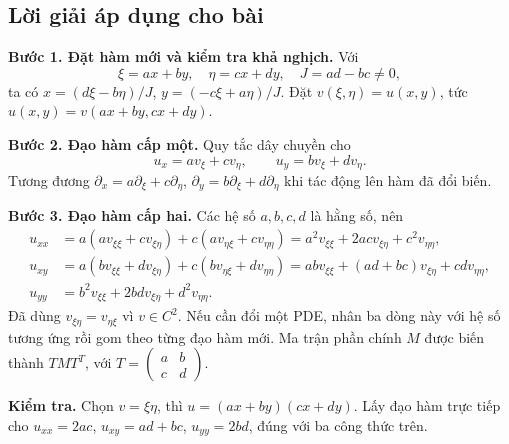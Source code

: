 \documentclass[10pt,a4paper]{article}
\begin{document}
\subsection*{Lời giải áp dụng cho bài}
\textbf{Bước 1. Đặt hàm mới và kiểm tra khả nghịch.} Với
\[\xi=ax+by,\quad\eta=cx+dy,\quad J=ad-bc\ne0,\]
ta có $x=(d\xi-b\eta)/J$, $y=(-c\xi+a\eta)/J$. Đặt $v(\xi,\eta)=u(x,y)$, tức $u(x,y)=v(ax+by,cx+dy)$.

\textbf{Bước 2. Đạo hàm cấp một.} Quy tắc dây chuyền cho
\[u_x=a v_\xi+c v_\eta,\qquad u_y=b v_\xi+d v_\eta.\]
Tương đương $\partial_x=a\partial_\xi+c\partial_\eta$, $\partial_y=b\partial_\xi+d\partial_\eta$ khi tác động lên hàm đã đổi biến.

\textbf{Bước 3. Đạo hàm cấp hai.} Các hệ số $a,b,c,d$ là hằng số, nên
\begin{align*}
u_{xx}&=a(av_{\xi\xi}+cv_{\xi\eta})+c(av_{\eta\xi}+cv_{\eta\eta})
=a^2v_{\xi\xi}+2acv_{\xi\eta}+c^2v_{\eta\eta},\\
u_{xy}&=a(bv_{\xi\xi}+dv_{\xi\eta})+c(bv_{\eta\xi}+dv_{\eta\eta})
=abv_{\xi\xi}+(ad+bc)v_{\xi\eta}+cdv_{\eta\eta},\\
u_{yy}&=b^2v_{\xi\xi}+2bdv_{\xi\eta}+d^2v_{\eta\eta}.
\end{align*}
Đã dùng $v_{\xi\eta}=v_{\eta\xi}$ vì $v\in C^2$. Nếu cần đổi một PDE, nhân ba dòng này với hệ số tương ứng rồi gom theo từng đạo hàm mới. Ma trận phần chính $M$ được biến thành $TMT^T$, với $T=\left(\begin{smallmatrix}a&b\\c&d\end{smallmatrix}\right)$.

\textbf{Kiểm tra.} Chọn $v=\xi\eta$, thì $u=(ax+by)(cx+dy)$. Lấy đạo hàm trực tiếp cho $u_{xx}=2ac$, $u_{xy}=ad+bc$, $u_{yy}=2bd$, đúng với ba công thức trên.
\end{document}
